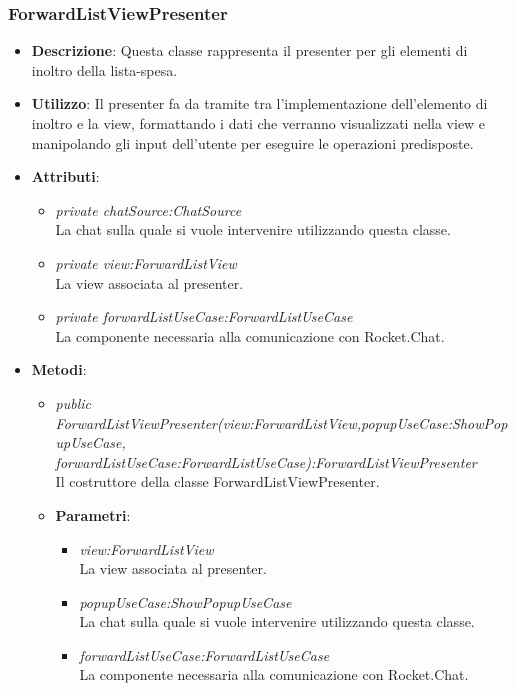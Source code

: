 \subsubsection{ForwardListViewPresenter}
\begin{itemize}
\item \textbf{Descrizione}: Questa classe rappresenta il presenter per gli elementi di inoltro della lista-spesa.
\item \textbf{Utilizzo}: Il presenter fa da tramite tra l'implementazione dell'elemento di inoltro e la view, formattando i dati che verranno visualizzati nella view e manipolando gli input dell'utente per eseguire le operazioni predisposte.
\item \textbf{Attributi}: 
	\begin{itemize}
	\item \textit{private chatSource:ChatSource}\\
	La chat sulla quale si vuole intervenire utilizzando questa classe.
	\item \textit{private view:ForwardListView}\\
	La view associata al presenter.
	\item \textit {private forwardListUseCase:ForwardListUseCase}\\
	La componente necessaria alla comunicazione con Rocket.Chat.
	\end{itemize}
\item \textbf{Metodi}:
	\begin{itemize}	
	\item \textit{public ForwardListViewPresenter(view:ForwardListView,popupUseCase:ShowPopupUseCase, forwardListUseCase:ForwardListUseCase):ForwardListViewPresenter}\\
	Il costruttore della classe ForwardListViewPresenter.
	\item{\textbf{Parametri}: \begin{itemize}
			\item \textit{view:ForwardListView}\\
			La view associata al presenter.
			\item \textit{popupUseCase:ShowPopupUseCase}\\
			La chat sulla quale si vuole intervenire utilizzando questa classe.			
			\item \textit{forwardListUseCase:ForwardListUseCase}\\
			La componente necessaria alla comunicazione con Rocket.Chat.
			\end{itemize}}

\end{itemize}
\end{itemize}
